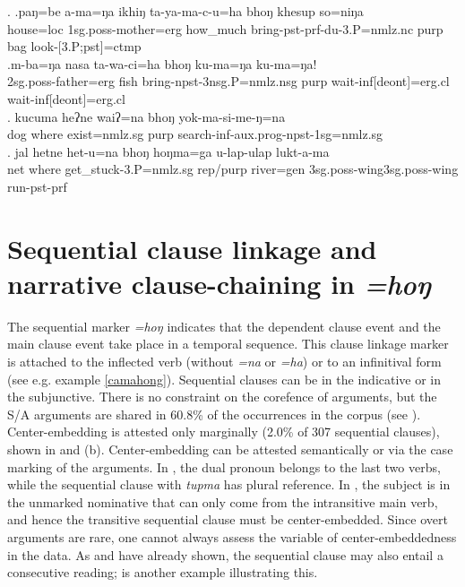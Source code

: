 	\ex. \ag.paŋ=be     a-ma=ŋa       ikhiŋ   ta-ya-ma-c-u=ha     bhoŋ khesup so=niŋa\\
	house{\sc =loc} {\sc 1sg.poss-}mother{\sc =erg} how\_much bring{\sc -pst-prf-du-3.P=nmlz.nc} {\sc purp} bag look{\sc -[3.P;pst]=ctmp}\\
	 
	\bg.m-ba=ŋa                nasa ta-wa-ci=ha                      bhoŋ ku-ma=ŋa                  ku-ma=ŋa!\\
{\sc 2sg.poss-}father{\sc =erg} fish bring{\sc -npst-3nsg.P=nmlz.nsg} {\sc purp}  wait{\sc -inf[deont]=erg.cl} wait{\sc -inf[deont]=erg.cl}\\
 
	\bg. kucuma heʔne waiʔ=na bhoŋ yok-ma-si-me-ŋ=na\\
	dog where exist{\sc [npst;3sg]=nmlz.sg} {\sc purp} search{\sc -inf-aux.prog-npst-1sg=nmlz.sg}\\
\bg. jal hetne het-u=na bhoŋ hoŋma=ga u-lap-ulap lukt-a-ma\\
net where get\_stuck{\sc -3.P=nmlz.sg} {\sc rep/purp} river{\sc =gen} {\sc 3sg.poss}-wing{\sc 3sg.poss}-wing run{\sc [3sg]-pst-prf}\\
  



\section{Sequential clause linkage and narrative clause-chaining in \emph{=hoŋ}}\label{adv-cl-seq}

The sequential marker \emph{=hoŋ}  indicates that the dependent clause event and the main clause event take place in a temporal sequence.  This clause linkage marker is attached to the  inflected verb (without \emph{=na} or \emph{=ha}) or to an infinitival form (see e.g. example \ref{camahong}). Sequential clauses can be in the indicative or in the subjunctive. There is no constraint on the corefence of arguments, but the S/A arguments are shared in 60.8\% of the occurrences in the corpus (see \Next). Center-embedding is attested only marginally (2.0\% of 307 sequential clauses), shown in \NNext[a] and (b). Center-embedding can be attested semantically or via the case marking of the arguments. In \NNext[a], the dual pronoun belongs to the last two verbs, while the sequential clause with \emph{tupma}  has plural reference. In \NNext[b], the subject is in the unmarked nominative that can only come from the intransitive main verb, and hence the transitive sequential clause must be center-embedded. Since overt arguments are rare, one cannot always assess the variable of center-embeddedness in the data. As \Next[b] and \NNext[b] have already shown, the sequential clause may also entail a consecutive reading; \NNext[c] is another example illustrating this.
	
